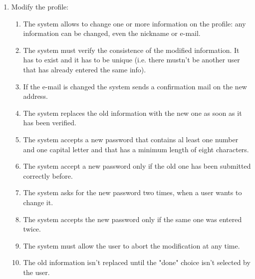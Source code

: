 \begin{enumerate}
\item Modify the profile:
\begin{enumerate}
\item The system allows to change one or more information on the profile: any information can be changed, even the nickname or e-mail.
\item The system must verify the consistence of the modified information. It has to exist and it has to be unique (i.e. there mustn't be another user that has already entered the same info). 
\item If the e-mail is changed the system sends a confirmation mail on the new address.
\item The system replaces the old information with the new one as soon as it has been verified.
\item The system accepts a new password that contains al least one number and one capital letter and that has a minimum length of eight characters.
\item The system accept a new password only if the old one has been submitted correctly before.
\item The system asks for the new password two times, when a user wants to change it.
\item The system accepts the new password only if the same one was entered twice.
\item The system must allow the user to abort the modification at any time.
\item The old information isn't  replaced until the "done" choice isn't selected by the user.
\end{enumerate}




\end{enumerate}




